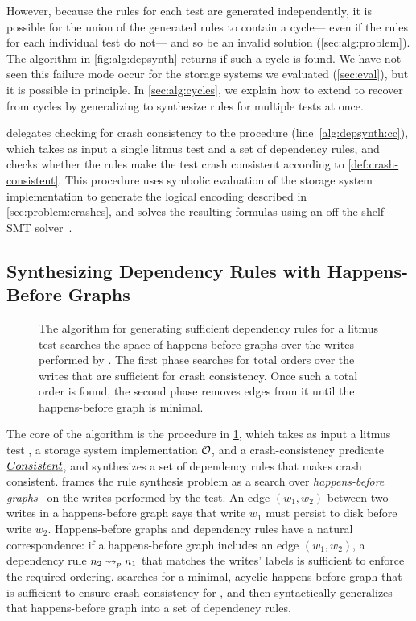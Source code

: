 However, because the rules for each test are generated independently,
it is possible for the union of the generated rules to contain a cycle---%
even if the rules for each individual test do not---%
and so be an invalid solution (\cref{sec:alg:problem}).
The algorithm in \cref{fig:alg:depsynth}
returns \UNKNOWN if such a cycle is found.
We have not seen this failure mode occur for the storage systems we evaluated (\cref{sec:eval}),
but it is possible in principle.
In \cref{sec:alg:cycles}, we explain how to extend \depsynthalg
to recover from cycles by generalizing  to synthesize rules for multiple tests at once.

\depsynthalg delegates checking for crash consistency
to the procedure \crashconsistentalg (line~\ref{alg:depsynth:cc}), 
which takes as input a single litmus test
and a set of dependency rules,
and checks whether the rules make the test crash consistent
according to \cref{def:crash-consistent}.
This procedure uses symbolic evaluation of the storage system implementation \sys
to generate the logical encoding described in \cref{sec:problem:crashes},
and solves the resulting formulas using an off-the-shelf SMT solver~\cite{niemetz:boolector}.\tighten

\subsection{Synthesizing Dependency Rules with Happens-Before Graphs}\label{sec:alg:onetest}

\begin{figure}
    \centering
    {\xsmall}
    \caption{The algorithm for generating sufficient dependency rules for a litmus test \test
    searches the space of happens-before graphs over the writes performed by \test.
    The first phase searches for total orders over the writes that are sufficient for crash consistency.
    Once such a total order is found, the second phase removes edges from it until the happens-before graph is minimal.}
    \label{fig:alg:rulesfortests}
\end{figure}

The core of the \depsynthalg algorithm is the
 procedure in \cref{fig:alg:rulesfortests},
which takes as input a litmus test \test,
a storage system implementation $\sys$,
and a crash-consistency predicate $\emph{Consistent}$,
and synthesizes a set of dependency rules
that makes \test crash consistent.
 frames the rule synthesis problem
as a search over \emph{happens-before graphs}~\cite{lamport:happens-before}
on the writes performed by the test.
An edge $(w_1, w_2)$ between two writes in a happens-before graph
says that write $w_1$ must persist to disk before write $w_2$.
Happens-before graphs and dependency rules have a natural correspondence:
if a happens-before graph includes an edge $(w_1, w_2)$,
a dependency rule $\deprule{n_2}{n_1}{p}$ that matches the writes' labels
is sufficient to enforce the required ordering.
 searches for a minimal, acyclic happens-before graph
that is sufficient to ensure crash consistency for \test,
and then syntactically generalizes that happens-before graph into a set of dependency rules.

